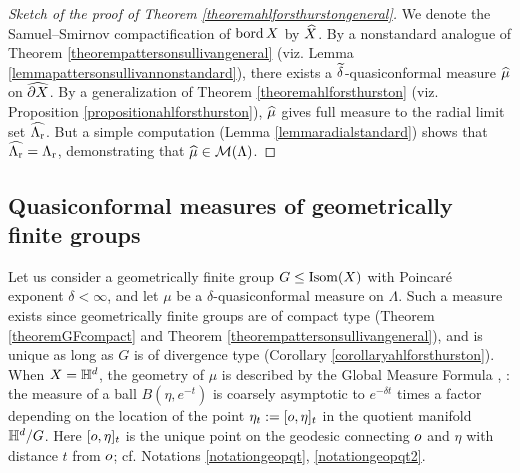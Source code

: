 \begin{proof}[Sketch of the proof of Theorem \ref{theoremahlforsthurstongeneral}]
We denote the Samuel--Smirnov compactification of $\operatorname{bord} X$ by $\widehat X$. By a nonstandard analogue of Theorem \ref{theorempattersonsullivangeneral} (viz. Lemma \ref{lemmapattersonsullivannonstandard}), there exists a $\widetilde\delta$-quasiconformal measure $\widehat\mu$ on $\widehat{\partial X}$. By a generalization of Theorem \ref{theoremahlforsthurston} (viz. Proposition \ref{propositionahlforsthurston}), $\widehat\mu$ gives full measure to the radial limit set $\widehat{\Lambda_{\mathrm r}}$. But a simple computation (Lemma \ref{lemmaradialstandard}) shows that $\widehat{\Lambda_{\mathrm r}} = \Lambda_{\mathrm r}$, demonstrating that $\widehat\mu\in\mathcal M(\Lambda)$.
\end{proof}

\subsection{Quasiconformal measures of geometrically finite groups}
Let us consider a geometrically finite group $G\leq\operatorname{Isom}(X)$ with Poincar\'e exponent $\delta < \infty$, and let $\mu$ be a $\delta$-quasiconformal measure on $\Lambda$. 
Such a measure exists since geometrically finite groups are of compact type (Theorem \ref{theoremGFcompact} and Theorem \ref{theorempattersonsullivangeneral}), and is unique as long as $G$ is of divergence type (Corollary \ref{corollaryahlforsthurston}). When $X = \H^d$, the geometry of $\mu$ is described by the Global Measure Formula \cite[Theorem on p.271]{Sullivan_entropy}, \cite[Theorem 2]{StratmannVelani}: the measure of a ball $B(\eta,e^{-t})$ is coarsely asymptotic to $e^{-\delta t}$ times a factor depending on the location of the point $\eta_t := [o,\eta]_t$ in the quotient manifold $\H^d/G$. Here $[o,\eta]_t$ is the unique point on the geodesic connecting $o$ and $\eta$ with distance $t$ from $o$; cf. Notations \ref{notationgeopqt}, \ref{notationgeopqt2}.

